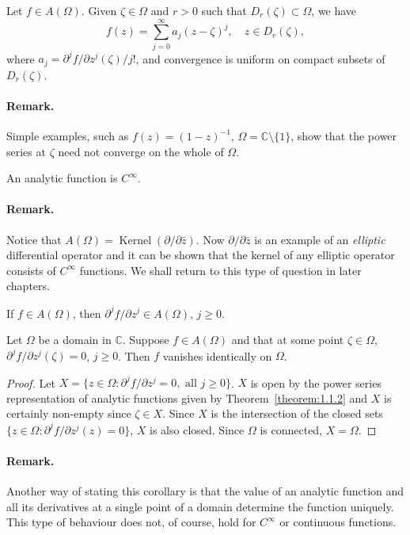  Let $f\in A(\Omega)$. Given $\zeta\in\Omega$ and $r>0$ such that $D_r(\zeta)\subset\Omega$, we have
\[
f(z)=\sum_{j=0}^{\infty}a_j(z-\zeta)^j,\quad z\in D_r(\zeta),
\]
where $a_j=\partial^j f/\partial z^j(\zeta)/j!$, and convergence is uniform on compact subsets of $D_r(\zeta)$.

\paragraph*{Remark.} Simple examples, such as $f(z)=(1-z)^{-1}$, $\Omega=\mathbb C\setminus\{1\}$, show that the power series at $\zeta$ need not converge on the whole of $\Omega$.

 An analytic function is $C^\infty$.
\paragraph*{Remark.} Notice that $A(\Omega)=\operatorname{Kernel}(\partial/\partial\bar z)$. Now $\partial/\partial\bar z$ is an example of an \emph{elliptic} differential operator and it can be shown that the kernel of any elliptic operator consists of $C^\infty$ functions. We shall return to this type of question in later chapters.

 If $f\in A(\Omega)$, then $\partial^j f/\partial z^j\in A(\Omega)$, $j\geq0$.

 Let $\Omega$ be a domain in $\mathbb C$. Suppose $f\in A(\Omega)$ and that at some point $\zeta\in\Omega$, $\partial^j f/\partial z^j(\zeta)=0$, $j\geq0$. Then $f$ vanishes identically on $\Omega$.
\begin{proof} Let $X=\{z\in\Omega:\partial^j f/\partial z^j=0,\text{ all }j\geq0\}$. $X$ is open by the power series representation of analytic functions given by Theorem~\ref{theorem:1.1.2} and $X$ is certainly non-empty since $\zeta\in X$. Since $X$ is the intersection of the closed sets $\{z\in\Omega:\partial^j f/\partial z^j(z)=0\}$, $X$ is also closed. Since $\Omega$ is connected, $X=\Omega$. \end{proof}
\paragraph*{Remark.} Another way of stating this corollary is that the value of an analytic function and all its derivatives at a single point of a domain determine the function uniquely. This type of behaviour does not, of course, hold for $C^\infty$ or continuous functions.

